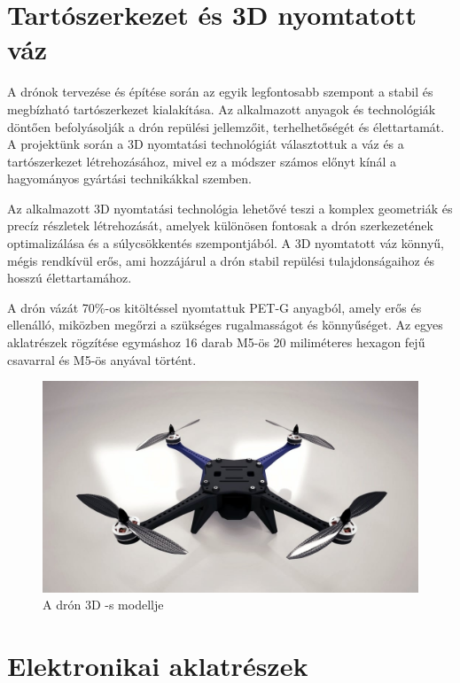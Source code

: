 \section{Tartószerkezet és 3D nyomtatott váz}

A drónok tervezése és építése során az egyik legfontosabb szempont a stabil és megbízható tartószerkezet kialakítása. Az alkalmazott anyagok és technológiák döntően befolyásolják a drón repülési jellemzőit, terhelhetőségét és élettartamát. A projektünk során a 3D nyomtatási technológiát választottuk a váz és a tartószerkezet létrehozásához, mivel ez a módszer számos előnyt kínál a hagyományos gyártási technikákkal szemben.

Az alkalmazott 3D nyomtatási technológia lehetővé teszi a komplex geometriák és precíz részletek létrehozását, amelyek különösen fontosak a drón szerkezetének optimalizálása és a súlycsökkentés szempontjából. A 3D nyomtatott váz könnyű, mégis rendkívül erős, ami hozzájárul a drón stabil repülési tulajdonságaihoz és hosszú élettartamához.

A drón vázát 70\%-os kitöltéssel nyomtattuk PET-G anyagból, amely erős és ellenálló, miközben megőrzi a szükséges rugalmasságot és könnyűséget. Az egyes aklatrészek rögzítése egymáshoz 16 darab M5-ös 20 miliméteres hexagon fejű csavarral és M5-ös anyával történt. 

\begin{figure}[H]
	\centering
	\includegraphics[scale=0.3]{figures/drone_model.JPG}
	\caption{A drón 3D -s modellje}
	\label{A drón 3D -s modellje}
\end{figure}

\section{Elektronikai aklatrészek}

